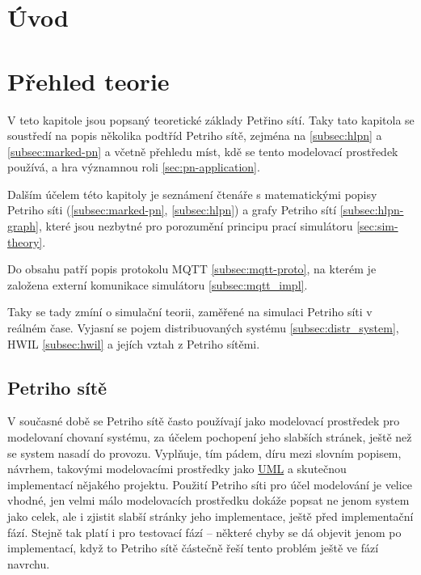 \chapter{Úvod}



\chapter{Přehled teorie}
\label{prehled}

V teto kapitole jsou popsaný teoretické základy Petřino sítí. Taky tato kapitola se soustředí na popis několika podtříd Petriho sítě, zejména na  \ref{subsec:hlpn} a  \ref{subsec:marked-pn} a  včetně přehledu míst, kdě se tento modelovací prostředek používá, a hra významnou roli \ref{sec:pn-application}.

Dalším účelem této kapitoly je seznámení čtenáře s matematickými popisy Petriho síti (\ref{subsec:marked-pn}, \ref{subsec:hlpn}) a grafy Petriho sítí \ref{subsec:hlpn-graph}, které jsou nezbytné pro porozumění principu prací simulátoru \ref{sec:sim-theory}.

Do obsahu patří popis protokolu MQTT \ref{subsec:mqtt-proto}, na kterém je založena externí komunikace simulátoru \ref{subsec:mqtt_impl}.

Taky se tady zmíní o simulační teorii, zaměřené na simulaci Petriho síti v reálném čase. Vyjasní se pojem distribuovaných systému \ref{subsec:distr_system}, HWIL \ref{subsec:hwil} a jejích vztah z Petriho sítěmi.

\section{Petriho sítě}
V současné době se Petriho sítě často používají jako modelovací prostředek pro modelovaní chovaní systému, za účelem pochopení jeho slabších stránek, ještě než se system nasadí do provozu. Vyplňuje, tím pádem, díru mezi slovním popisem, návrhem, takovými modelovacími prostředky jako \href{https://en.wikipedia.org/wiki/Unified_Modeling_Language}{UML} a skutečnou implementací nějakého projektu. Použití Petriho síti pro účel modelování je velice vhodné, jen velmi málo modelovacích prostředku dokáže popsat ne jenom system jako celek, ale i zjistit slabší stránky jeho implementace, ještě před implementační fází. Stejně tak platí i pro testovací fází -- některé chyby se dá objevit jenom po implementací, když to Petriho sítě částečně řeší tento problém ještě ve fází navrchu.


